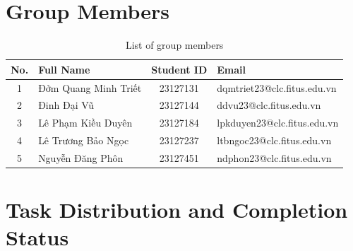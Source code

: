 \newpage
\section*{Group Members}

\begin{table}[H]
\centering
\renewcommand{\arraystretch}{1.5}
    \begin{tabularx}{\textwidth}{|c|X|c|X|}
    \hline
    \textbf{No.} & \textbf{Full Name} & \textbf{Student ID} & \textbf{Email} \\ \hline
    1 & Đởm Quang Minh Triết & 23127131 & dqmtriet23@clc.fitus.edu.vn \\ \hline
    2 & Đinh Đại Vũ & 23127144 & ddvu23@clc.fitus.edu.vn \\ \hline
    3 & Lê Phạm Kiều Duyên & 23127184 & lpkduyen23@clc.fitus.edu.vn \\ \hline
    4 & Lê Trương Bảo Ngọc & 23127237 & ltbngoc23@clc.fitus.edu.vn \\ \hline
    5 & Nguyễn Đăng Phôn & 23127451 & ndphon23@clc.fitus.edu.vn \\ \hline
    \end{tabularx}
\caption{List of group members}
\label{tab:thongtin}
\end{table}

\vspace{1cm}
\renewcommand{\arraystretch}{1.5}
\section*{Task Distribution and Completion Status}

\begin{table}[H]
    \centering
    \caption{Task distribution and completion status}
    \label{tab:phancong}
\end{table}




